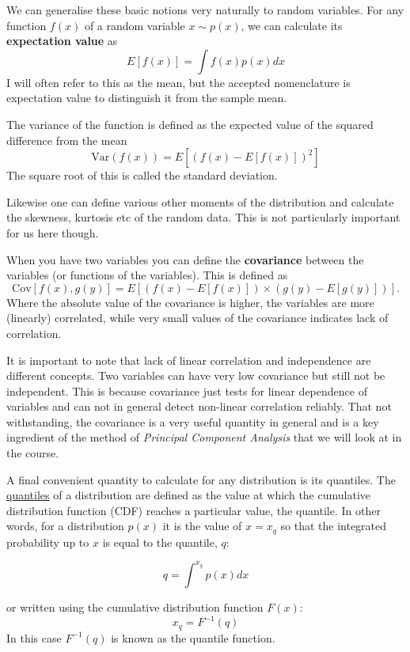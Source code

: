\documentclass[a4paper,10pt]{article}
\newcommand{\link}[2]{{\color{blue}\href{#1}{#2}}}
\begin{document}
We can generalise these basic notions very naturally to random variables. 
For any function $f(x)$ of a random variable $x\sim p(x)$, we can calculate its \textbf{expectation value} as 
$$E\left[f(x)\right] = \int f(x) p(x) dx$$
I will often refer to this as the mean, but the accepted nomenclature is expectation value to distinguish it from the sample mean. 

The variance of the function is defined as the expected value of the squared difference from the mean
$$\mathrm{Var}(f(x)) = E\left[(f(x)-E\left[f(x)\right])^2\right] $$
The square root of this is called the standard deviation.

Likewise one can define various other moments of the distribution and calculate the skewness, kurtosis etc of the random data. This is not particularly important for us here though.

When you have two variables you can define the \textbf{covariance} between the variables (or functions of the variables). This is defined as
$$\mathrm{Cov}\left[f(x), g(y)\right] = E\left[ \left( f(x) - E\left[f(x)\right] \right) \times \left( g(y) - E\left[g(y)\right] \right)\right]. $$
Where the absolute value of the covariance is higher, the variables are more (linearly) correlated, while very small values of the covariance indicates lack of correlation.

It is important to note that lack of linear correlation and independence are different concepts. Two variables can have very low covariance but still not be independent. This is because covariance just tests for linear dependence of variables and can not in general detect non-linear correlation reliably. That not withstanding, the covariance is a very useful quantity in general and is a key ingredient of the method of \textit{Principal Component Analysis} that we will look at in the course.

A final convenient quantity to calculate for any distribution is its quantiles. The \link{https://en.wikipedia.org/wiki/Quantile}{quantiles} of a distribution are defined as the value at which the cumulative distribution function (CDF) reaches a particular value, the quantile. In other words, for a distribution $p(x)$ it is the value of $x=x_q$ so that the integrated probability up to $x$ is equal to the quantile, $q$:

$$q = \int^{x_q} p(x) dx$$

or written using the cumulative distribution function $F(x)$:
$$x_q = F^{-1}(q)$$
In this case $F^{-1}(q)$ is known as the quantile function. 
\end{document}
